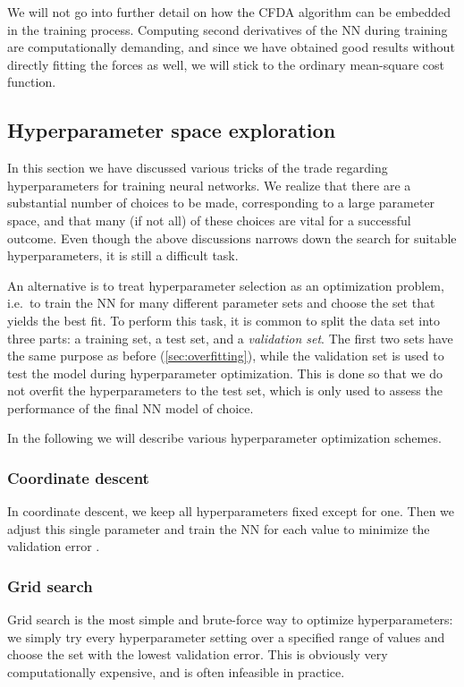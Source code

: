 \documentclass[twoside,english]{uiofysmaster}
\begin{document}
We will not go into further detail on how the CFDA algorithm can be embedded in the training process. 
Computing second derivatives of the NN during training are computationally demanding, and since we have obtained 
good results without directly fitting the forces as well, we will stick to the ordinary mean-square cost function. 



\subsection{Hyperparameter space exploration} \label{sec:optimizingHyperparameters}
In this section we have discussed various tricks of the trade regarding hyperparameters for training neural networks. 
We realize that there are a substantial number of choices to be made, corresponding to a large parameter space, and 
that many (if not all) of these choices are vital for a successful outcome. Even though the above discussions narrows down the search 
for suitable hyperparameters, it is still a difficult task. 

An alternative is to treat hyperparameter selection as an optimization problem, i.e.\ to train the NN for many different 
parameter sets and choose the set that yields the best fit. To perform this task, it is common to split the data set 
into three parts: a training set, a test set, and a \textit{validation set}. The first two sets have the same 
purpose as before (\autoref{sec:overfitting}), while the validation set is used to test the model during hyperparameter 
optimization. This is done so that we do not overfit the hyperparameters to the test set, which is only used to assess 
the performance of the final NN model of choice.

In the following we will describe various hyperparameter optimization schemes. 

\subsubsection{Coordinate descent}
In coordinate descent, we keep all hyperparameters fixed except for one. Then we adjust this single parameter and train the NN
for each value to minimize the validation error  .

\subsubsection{Grid search}
Grid search is the most simple and brute-force way to optimize hyperparameters: we simply try every hyperparameter setting 
over a specified range of values and choose the set with the lowest validation error. This is obviously very computationally 
expensive, and is often infeasible in practice. 
\end{document}
